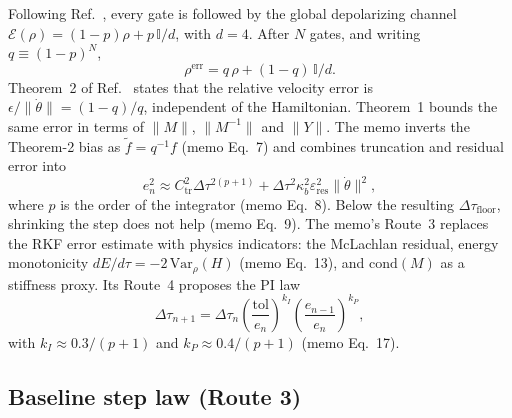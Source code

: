 \documentclass[aps,pra,reprint,superscriptaddress,nofootinbib]{revtex4-2}
\newcommand{\dt}{\Delta\tau}
\newcommand{\thetadot}{\dot\theta}
\newcommand{\cond}{\mathrm{cond}}
\newcommand{\tol}{\mathrm{tol}}
\begin{document}
Following Ref.~\cite{QDP2024}, every gate is followed by the global depolarizing channel
$\mathcal E(\rho)=(1-p)\rho+p\,\mathbb{I}/d$, with $d=4$. After $N$ gates, and writing
$q\equiv(1-p)^N$,
\begin{equation}
  \rho^{\mathrm{err}} = q\,\rho + (1-q)\,\mathbb{I}/d .
  \label{eq:depol}
\end{equation}
Theorem~2 of Ref.~\cite{QDP2024} states that the relative velocity error is
$\epsilon/\|\thetadot\|=(1-q)/q$, independent of the Hamiltonian. Theorem~1 bounds the same
error in terms of $\|M\|$, $\|M^{-1}\|$ and $\|Y\|$. The memo inverts the Theorem-2 bias as
$\tilde f=q^{-1}f$ (memo Eq.~7) and combines truncation and residual error into
\begin{equation}
  e_n^2\approx C_{\mathrm{tr}}^2\dt^{2(p+1)}+\dt^2\kappa_b^2\varepsilon_{\mathrm{res}}^2\|\thetadot\|^2,
  \label{eq:memo8}
\end{equation}
where $p$ is the order of the integrator (memo Eq.~8). Below the resulting $\dt_{\mathrm{floor}}$,
shrinking the step does not help (memo Eq.~9). The memo's Route~3 replaces the RKF error estimate
with physics indicators: the McLachlan residual, energy monotonicity
$dE/d\tau=-2\,\mathrm{Var}_\rho(H)$ (memo Eq.~13), and $\cond(M)$ as a stiffness proxy. Its
Route~4 proposes the PI law
\begin{equation}
  \dt_{n+1}=\dt_n\left(\frac{\tol}{e_n}\right)^{k_I}\left(\frac{e_{n-1}}{e_n}\right)^{k_P},
  \label{eq:PI}
\end{equation}
with $k_I\approx0.3/(p+1)$ and $k_P\approx0.4/(p+1)$ (memo Eq.~17).

\subsection{Baseline step law (Route 3)}
\label{sec:baseline}
\end{document}
